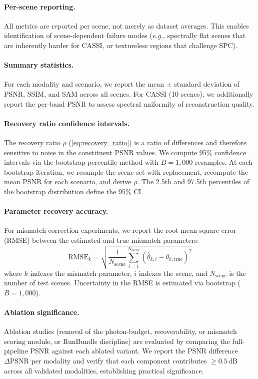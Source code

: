 \documentclass[11pt]{article}
\newcommand{\eg}{\textit{e.g.}}
\newcommand{\psnr}{\mathrm{PSNR}}
\newcommand{\recoveryratio}{\rho}
\begin{document}
\paragraph{Per-scene reporting.}
All metrics are reported per scene, not merely as dataset averages.  This
enables identification of scene-dependent failure modes (\eg{}, spectrally
flat scenes that are inherently harder for CASSI, or textureless regions
that challenge SPC).

\paragraph{Summary statistics.}
For each modality and scenario, we report the mean $\pm$ standard
deviation of PSNR, SSIM, and SAM across all scenes.  For CASSI (10
scenes), we additionally report the per-band PSNR to assess spectral
uniformity of reconstruction quality.

\paragraph{Recovery ratio confidence intervals.}
The recovery ratio $\recoveryratio$ (\cref{eq:recovery_ratio}) is a ratio
of differences and therefore sensitive to noise in the constituent PSNR
values.  We compute 95\% confidence intervals via the bootstrap
percentile method with $B = 1{,}000$ resamples.  At each bootstrap
iteration, we resample the scene set with replacement, recompute the
mean PSNR for each scenario, and derive $\recoveryratio$.  The 2.5th
and 97.5th percentiles of the bootstrap distribution define the 95\% CI.

\paragraph{Parameter recovery accuracy.}
For mismatch correction experiments, we report the root-mean-square error
(RMSE) between the estimated and true mismatch parameters:
\begin{equation}
  \text{RMSE}_k = \sqrt{\frac{1}{N_{\text{scene}}}
    \sum_{i=1}^{N_{\text{scene}}}
    (\hat\theta_{k,i} - \theta_{k,\text{true}})^2}
\end{equation}
where $k$ indexes the mismatch parameter, $i$ indexes the scene, and
$N_{\text{scene}}$ is the number of test scenes.  Uncertainty in the RMSE
is estimated via bootstrap ($B = 1{,}000$).

\paragraph{Ablation significance.}
Ablation studies (removal of the photon-budget, recoverability, or
mismatch scoring module, or RunBundle discipline) are evaluated by comparing the
full-pipeline PSNR against each ablated variant.  We report the PSNR
difference $\Delta\psnr$ per modality and verify that each component
contributes $\geq 0.5$\,dB across all validated modalities, establishing
practical significance.
\end{document}
